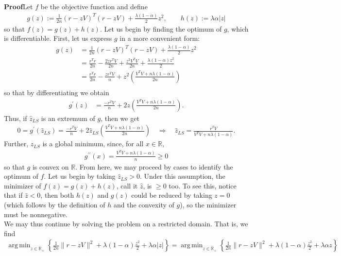 \documentclass[10pt]{article}
\newcommand{\bp}[1]{\left({#1}\right)}
\newcommand{\mbb}[1]{\mathbb{#1}}
\newcommand{\1}[1]{\mathbbm{1}_{#1}}
\DeclareMathOperator{\argmin}{arg\,min}
\begin{document}
    {\bf Proof}\hspace{5pt}Let $f$ be the objective function and define
    \begin{align*}
        g(z):=\frac{1}{2n}(r-zV)^T(r-zV)+\frac{\lambda(1-\alpha)}{2}z^2,\qquad h(z):=\lambda\alpha|z|
    \end{align*}
    so that $f(z)=g(z)+h(z)$. Let us begin by finding the optimum of $g$, which is differentiable. First, let us express $g$ in a more convenient form:
    \begin{align*}
        g(z)&=\frac{1}{2n}(r-zV)^T(r-zV)+\frac{\lambda(1-\alpha)}{2}z^2\\
        &=\frac{r^Tr}{2n}-\frac{2zr^TV}{2n}+\frac{z^2V^TV}{2n}+\frac{\lambda(1-\alpha)z^2}{2}\\
        &=\frac{r^Tr}{2n}-\frac{zr^TV}{n}+z^2\bp{\frac{V^TV+n\lambda(1-\alpha)}{2n}}\\
    \end{align*}
    so that by differentiating we obtain
    \begin{align*}
        g^\prime(z)&=\frac{-r^TV}{n}+2z\bp{\frac{V^TV+n\lambda(1-\alpha)}{2n}}.
    \end{align*}
    Thus, if $\hat{z}_{LS}$ is an extremum of $g$, then we get
    \begin{align*}
        0=g^\prime(\hat{z}_{LS})=\frac{-r^TV}{n}+2\hat{z}_{LS}\bp{\frac{V^TV+n\lambda(1-\alpha)}{2n}}\quad\Rightarrow\quad \hat{z}_{LS}=\frac{r^TV}{V^TV+n\lambda(1-\alpha)}.
    \end{align*}
    Further, $\hat{z}_{LS}$ is a global minimum, since, for all $x\in\mbb{R}$,
    \begin{align*}
        g^{\prime\prime}(x)=\frac{V^TV+n\lambda(1-\alpha)}{n}\geq0
    \end{align*}
    so that $g$ is convex on $\mbb{R}$. From here, we may proceed by cases to identify the optimum of $f$. Let us begin by
    taking $\hat{z}_{LS}>0$. Under this assumption, the minimizer of $f(z)=g(z)+h(z)$, call it $\hat{z}$, is $\geq 0$ too.
    To see this, notice that if $\hat{z}<0$, then both $h(z)$ and $g(z)$ could be reduced by taking $z=0$ (which follows by the definition of $h$ and the convexity of $g$),
    so the minimizer must be nonnegative.\\[5pt]
    We may thus continue by solving the problem on a restricted domain. That is, we find
    \begin{align*}
        \argmin_{z\in\mbb{R}_+}\left\{\frac{1}{2n}\|r-zV\|^2+\lambda(1-\alpha)\frac{z^2}{2}+\lambda\alpha|z|\right\} = \argmin_{z\in\mbb{R}_+}\left\{\frac{1}{2n}\|r-zV\|^2+\lambda(1-\alpha)\frac{z^2}{2}+\lambda\alpha z\right\}
    \end{align*}
\end{document}
